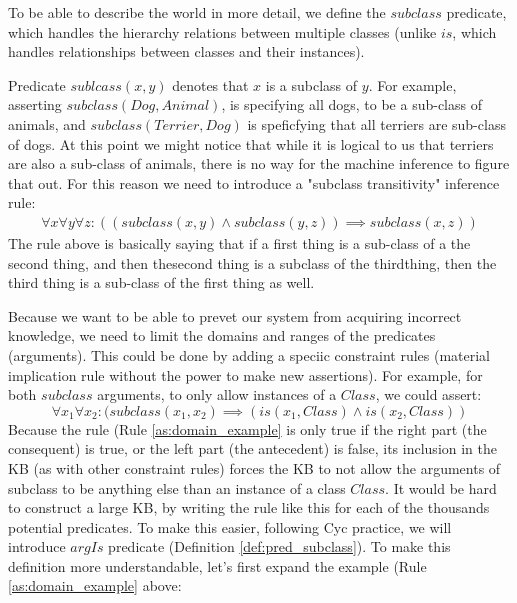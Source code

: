 To be able to describe the world in more detail, we define the $subclass$ 
predicate, which handles the hierarchy relations between multiple classes 
(unlike $is$, which handles relationships between classes and their instances).

\begin{definition}\label{def:pred_subclass}
Predicate $sublcass(x,y)$ denotes that $x$ is a subclass of $y$. For example, 
asserting $subclass(Dog, Animal)$, is specifying all dogs, to be a sub-class of
animals, and $subclass(Terrier,Dog)$ is speficfying that all terriers are 
sub-class of dogs. At this point we might notice that while it is logical to us
that terriers are also a sub-class of animals, there is no way for the machine
inference to figure that out. For this reason we need to introduce a
"subclass transitivity" inference rule:
\begin{equation}\label{rule:subclass_transitivity}
\begin{gathered}
  \forall x \forall y \forall z: ((subclass(x,y) \land subclass(y,z)) \implies subclass(x,z))
\end{gathered}
\end{equation}
The rule above is basically saying that if a first thing is a sub-class of a
the second thing, and then thesecond thing is a subclass of the thirdthing,
then the third thing is a sub-class of the first thing as well. 
\end{definition}

Because we want to be able to prevet our system from acquiring incorrect 
knowledge, we need to limit the domains and ranges of the predicates 
(arguments). This could be done by adding a speciic constraint rules
(material implication rule without the power to make new assertions). For 
example, for both $subclass$ arguments, to only allow instances of a $Class$, 
we could assert:
\begin{equation}\label{as:domain_example}
  \forall x_1 \forall x_2: (subclass(x_1,x_2) \implies (is(x_1,Class) \land 
  is(x_2,Class))
\end{equation}
Because the rule (Rule \ref{as:domain_example} is only true if the right part
(the consequent) is true, or the left part (the antecedent) is false, its
inclusion in the KB (as with other constraint rules) forces the KB to not allow
the arguments of subclass to be anything else than an instance of a class 
$Class$. It would be hard to construct a large KB, by writing the rule
like this for each of the thousands potential predicates. To make this easier,
following Cyc practice\parencite{Lenat1995}, we will introduce $argIs$ 
predicate (Definition \ref{def:pred_subclass}). To make this definition more understandable, let's
first expand the example (Rule \ref{as:domain_example} above:

